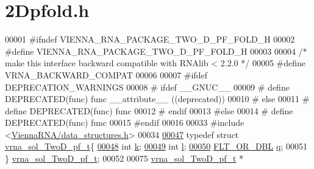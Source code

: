 \hypertarget{2Dpfold_8h_source}{}\section{2\+Dpfold.h}
\label{2Dpfold_8h_source}

\begin{DoxyCode}
00001 \textcolor{preprocessor}{#ifndef VIENNA\_RNA\_PACKAGE\_TWO\_D\_PF\_FOLD\_H}
00002 \textcolor{preprocessor}{#define VIENNA\_RNA\_PACKAGE\_TWO\_D\_PF\_FOLD\_H}
00003 
00004 \textcolor{comment}{/* make this interface backward compatible with RNAlib < 2.2.0 */}
00005 \textcolor{preprocessor}{#define VRNA\_BACKWARD\_COMPAT}
00006 
00007 \textcolor{preprocessor}{#ifdef DEPRECATION\_WARNINGS}
00008 \textcolor{preprocessor}{# ifdef \_\_GNUC\_\_}
00009 \textcolor{preprocessor}{#  define DEPRECATED(func) func \_\_attribute\_\_ ((deprecated))}
00010 \textcolor{preprocessor}{# else}
00011 \textcolor{preprocessor}{#  define DEPRECATED(func) func}
00012 \textcolor{preprocessor}{# endif}
00013 \textcolor{preprocessor}{#else}
00014 \textcolor{preprocessor}{# define DEPRECATED(func) func}
00015 \textcolor{preprocessor}{#endif}
00016 
00033 \textcolor{preprocessor}{#include <\mbox{\hyperlink{data__structures_8h}{ViennaRNA/data\_structures.h}}>}
00034 
\mbox{\hyperlink{group__kl__neighborhood__pf}{00047}} \textcolor{keyword}{typedef} \textcolor{keyword}{struct }\mbox{\hyperlink{group__kl__neighborhood__pf_structvrna__sol__TwoD__pf__t}{vrna\_sol\_TwoD\_pf\_t}}\{
\mbox{\hyperlink{group__kl__neighborhood__pf_ad1f23b46dc4ebd373abdeb0382d87b83}{00048}}   \textcolor{keywordtype}{int} \mbox{\hyperlink{group__kl__neighborhood__pf_ad1f23b46dc4ebd373abdeb0382d87b83}{k}};          
\mbox{\hyperlink{group__kl__neighborhood__pf_a01133c264eff2c988d144e07803d1b8b}{00049}}   \textcolor{keywordtype}{int} \mbox{\hyperlink{group__kl__neighborhood__pf_a01133c264eff2c988d144e07803d1b8b}{l}};          
\mbox{\hyperlink{group__kl__neighborhood__pf_a17ebbf425b8769ded74b5c7b85e58ee1}{00050}}   \mbox{\hyperlink{group__data__structures_ga31125aeace516926bf7f251f759b6126}{FLT\_OR\_DBL}}  \mbox{\hyperlink{group__kl__neighborhood__pf_a17ebbf425b8769ded74b5c7b85e58ee1}{q}};  
00051 \} \mbox{\hyperlink{group__kl__neighborhood__pf_ga5e449fbd695406aabd2bcabddc374621}{vrna\_sol\_TwoD\_pf\_t}};
00052 
00075 \mbox{\hyperlink{group__kl__neighborhood__pf_structvrna__sol__TwoD__pf__t}{vrna\_sol\_TwoD\_pf\_t}}  *

\end{DoxyCode}
